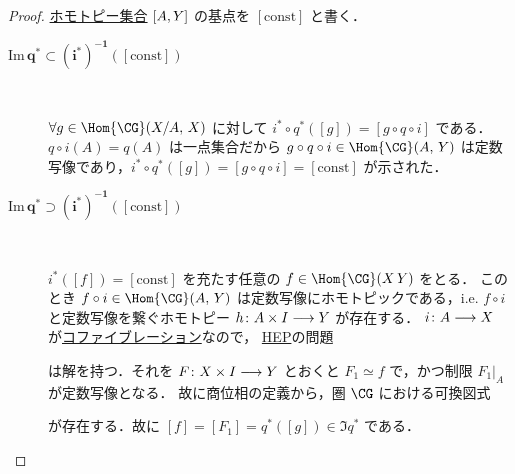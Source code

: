 \documentclass[algtopo_main]{subfiles}
\begin{document}
\begin{proof}
    \hyperref[def:homotopy-set]{ホモトピー集合} $\comm{A}{Y}$ の基点を $[\mathrm{const}]$ と書く．
    \begin{description}
        \item[\textbf{$\bm{\mathrm{Im}\, q^* \subset (i^*)^{-1}([\mathrm{const}])}$}] 　

        $\forall g \in \Hom{\CG} (X/A,\, X)$ に対して 
        $i^* \circ q^* ([g]) = [g \circ q \circ i]$ である．$q \circ i(A) = q(A)$ は一点集合だから $g \circ q \circ i \in \Hom{\CG}(A,\, Y)$ は定数写像であり，$i^* \circ q^* ([g]) = [g \circ q \circ i] = [\mathrm{const}]$ が示された．

        \item[\textbf{$\bm{\mathrm{Im}\, q^* \supset (i^*)^{-1}([\mathrm{const}])}$}] 　
        
        $i^*([f]) = [\mathrm{const}]$ を充たす任意の $f \in \Hom{\CG}(X\, Y)$ をとる．
        このとき $f \circ i \in \Hom{\CG}(A,\, Y)$ は定数写像にホモトピックである，i.e.
        $f \circ i$ と定数写像を繋ぐホモトピー $h \colon A \times I \longrightarrow Y$ が存在する．
        $i \colon A \longrightarrow X$ が\hyperref[def:cofibration]{コファイブレーション}なので，
        \hyperref[def:HEP]{HEP}の問題
        \begin{center}
        \end{center}
        は解を持つ．それを $F \colon X \times I \longrightarrow Y$ とおくと $F_1 \simeq f$ で，かつ制限 $F_1|_A$ が定数写像となる．
        故に商位相の定義から，圏 $\CG$ における可換図式
        \begin{center}
        \end{center}
        が存在する．故に $[f] = [F_1] = q^*([g]) \in \Im q^*$ である．
    \end{description}
\end{proof}
\end{document}
